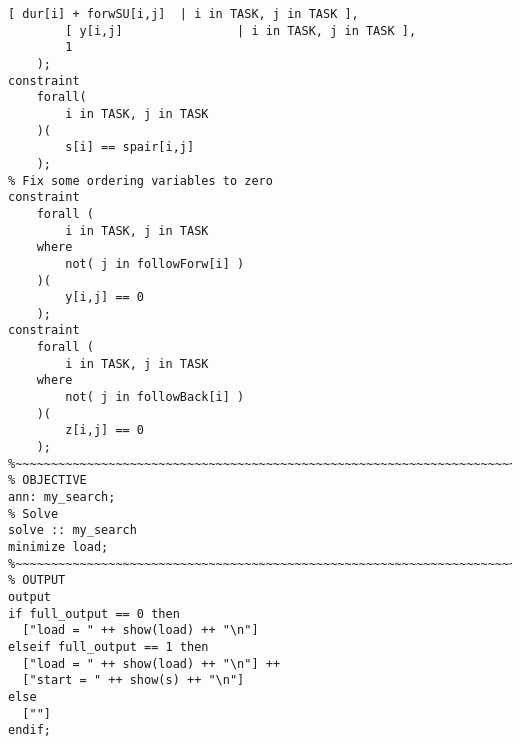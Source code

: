\begin{lstlisting}[caption={Full MiniZinc model for CP sub-problems},label={lst:appen:CPmodel},language=minizinc]
		[ dur[i] + forwSU[i,j] 	| i in TASK, j in TASK ],
		[ y[i,j]				| i in TASK, j in TASK ],
		1
	);
constraint
	forall( 
		i in TASK, j in TASK
	)(
		s[i] == spair[i,j]
	);
% Fix some ordering variables to zero
constraint
	forall (
		i in TASK, j in TASK
	where
		not( j in followForw[i] )
	)(
		y[i,j] == 0
	);
constraint
	forall (
		i in TASK, j in TASK
	where
		not( j in followBack[i] )
	)(
		z[i,j] == 0
	);
%~~~~~~~~~~~~~~~~~~~~~~~~~~~~~~~~~~~~~~~~~~~~~~~~~~~~~~~~~~~~~~~~~~~~~~~~~~~~~~~%
% OBJECTIVE
ann: my_search;
% Solve
solve :: my_search
minimize load;
%~~~~~~~~~~~~~~~~~~~~~~~~~~~~~~~~~~~~~~~~~~~~~~~~~~~~~~~~~~~~~~~~~~~~~~~~~~~~~~~%
% OUTPUT
output
if full_output == 0 then    
  ["load = " ++ show(load) ++ "\n"]
elseif full_output == 1 then
  ["load = " ++ show(load) ++ "\n"] ++
  ["start = " ++ show(s) ++ "\n"]
else
  [""]
endif;
\end{lstlisting}




